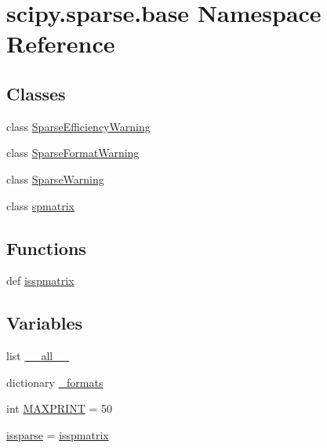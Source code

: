 \hypertarget{namespacescipy_1_1sparse_1_1base}{}\section{scipy.\+sparse.\+base Namespace Reference}
\label{namespacescipy_1_1sparse_1_1base}
\subsection*{Classes}
\begin{DoxyCompactItemize}
\item 
class \hyperlink{classscipy_1_1sparse_1_1base_1_1SparseEfficiencyWarning}{Sparse\+Efficiency\+Warning}
\item 
class \hyperlink{classscipy_1_1sparse_1_1base_1_1SparseFormatWarning}{Sparse\+Format\+Warning}
\item 
class \hyperlink{classscipy_1_1sparse_1_1base_1_1SparseWarning}{Sparse\+Warning}
\item 
class \hyperlink{classscipy_1_1sparse_1_1base_1_1spmatrix}{spmatrix}
\end{DoxyCompactItemize}
\subsection*{Functions}
\begin{DoxyCompactItemize}
\item 
def \hyperlink{namespacescipy_1_1sparse_1_1base_a750ffe065e66e2bcb1c9510f227505fe}{isspmatrix}
\end{DoxyCompactItemize}
\subsection*{Variables}
\begin{DoxyCompactItemize}
\item 
list \hyperlink{namespacescipy_1_1sparse_1_1base_a3cc24131cd5063928a064bab2c0d77b4}{\+\_\+\+\_\+all\+\_\+\+\_\+}
\item 
dictionary \hyperlink{namespacescipy_1_1sparse_1_1base_aca2217a1daada66e8bf46eba9bf049cb}{\+\_\+formats}
\item 
int \hyperlink{namespacescipy_1_1sparse_1_1base_a37d80f01ce5867a27988275dedd37503}{M\+A\+X\+P\+R\+I\+N\+T} = 50
\item 
\hyperlink{namespacescipy_1_1sparse_1_1base_a714d51e90e4241e27a2d0ebd56703d46}{issparse} = \hyperlink{namespacescipy_1_1sparse_1_1base_a750ffe065e66e2bcb1c9510f227505fe}{isspmatrix}
\end{DoxyCompactItemize}


